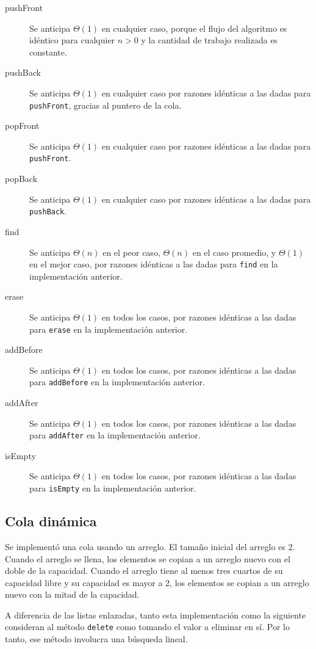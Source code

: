 \begin{description}
	\item[pushFront]{
		Se anticipa $\Theta{} (1)$ en cualquier caso, porque el flujo del algoritmo es idéntico para cualquier $n > 0$ y la cantidad de trabajo realizada es constante.
	}
	\item[pushBack]{
		Se anticipa $\Theta{} (1)$ en cualquier caso por razones idénticas a las dadas para \texttt{pushFront}, gracias al puntero de la cola.
	}
	\item[popFront]{
		Se anticipa $\Theta{} (1)$ en cualquier caso por razones idénticas a las dadas para \texttt{pushFront}.
	}
	\item[popBack]{
		Se anticipa $\Theta{} (1)$ en cualquier caso por razones idénticas a las dadas para \texttt{pushBack}.
	}
	\item[find]{
		Se anticipa $\Theta{} (n)$ en el peor caso, $\Theta{} (n)$ en el caso promedio, y $\Theta{} (1)$ en el mejor caso, por razones idénticas a las dadas para \texttt{find} en la implementación anterior.
	}
	\item[erase]{
		Se anticipa $\Theta{} (1)$ en todos los casos, por razones idénticas a las dadas para \texttt{erase} en la implementación anterior.
	}
	\item[addBefore]{
		Se anticipa $\Theta{} (1)$ en todos los casos, por razones idénticas a las dadas para \texttt{addBefore} en la implementación anterior.
	}
	\item[addAfter]{
		Se anticipa $\Theta{} (1)$ en todos los casos, por razones idénticas a las dadas para \texttt{addAfter} en la implementación anterior.
	}
	\item[isEmpty]{
		Se anticipa $\Theta{} (1)$ en todos los casos, por razones idénticas a las dadas para \texttt{isEmpty} en la implementación anterior.
	}
\end{description}

\subsection{Cola dinámica}

Se implementó una cola usando un arreglo. El tamaño inicial del arreglo es 2. Cuando el arreglo se llena, los elementos se copian a un arreglo nuevo con el doble de la capacidad. Cuando el arreglo tiene al menos tres cuartos de su capacidad libre y su capacidad es mayor a 2, los elementos se copian a un arreglo nuevo con la mitad de la capacidad.

A diferencia de las listas enlazadas, tanto esta implementación como la siguiente consideran al método \texttt{delete} como tomando el valor a eliminar en sí. Por lo tanto, ese método involucra una búsqueda lineal.

